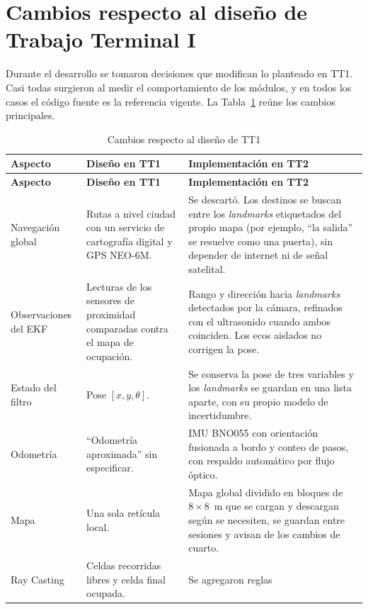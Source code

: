 \section{Cambios respecto al diseño de Trabajo Terminal I}

Durante el desarrollo se tomaron decisiones que modifican lo planteado en TT1. Casi
todas surgieron al medir el comportamiento de los módulos, y en todos los casos el
código fuente es la referencia vigente. La Tabla~\ref{tab:cambios_tt1} reúne los
cambios principales.

\begin{longtable}{|p{3.0cm}|p{5.4cm}|p{6.1cm}|}
\caption{Cambios respecto al diseño de TT1}
\label{tab:cambios_tt1} \\
\hline
\textbf{Aspecto} & \textbf{Diseño en TT1} & \textbf{Implementación en TT2} \\
\hline
\endfirsthead
\hline
\textbf{Aspecto} & \textbf{Diseño en TT1} & \textbf{Implementación en TT2} \\
\hline
\endhead
Navegación global & Rutas a nivel ciudad con un servicio de cartografía digital y
GPS NEO-6M. & Se descartó. Los destinos se buscan entre los \emph{landmarks}
etiquetados del propio mapa (por ejemplo, ``la salida'' se resuelve como una puerta),
sin depender de internet ni de señal satelital. \\
\hline
Observaciones del EKF & Lecturas de los sensores de proximidad comparadas contra
el mapa de ocupación. & Rango y dirección hacia \emph{landmarks} detectados por la
cámara, refinados con el ultrasonido cuando ambos coinciden. Los ecos aislados no
corrigen la pose. \\
\hline
Estado del filtro & Pose $[x, y, \theta]$. & Se conserva la pose de tres variables y
los \emph{landmarks} se guardan en una lista aparte, con su propio modelo de
incertidumbre. \\
\hline
Odometría & ``Odometría aproximada'' sin especificar. & IMU BNO055 con orientación
fusionada a bordo y conteo de pasos, con respaldo automático por flujo óptico. \\
\hline
Mapa & Una sola retícula local. & Mapa global dividido en bloques de
$8 \times 8$~m que se cargan y descargan según se necesiten, se guardan entre
sesiones y avisan de los cambios de cuarto. \\
\hline
Ray Casting & Celdas recorridas libres y celda final ocupada. & Se agregaron reglas

\end{longtable}
